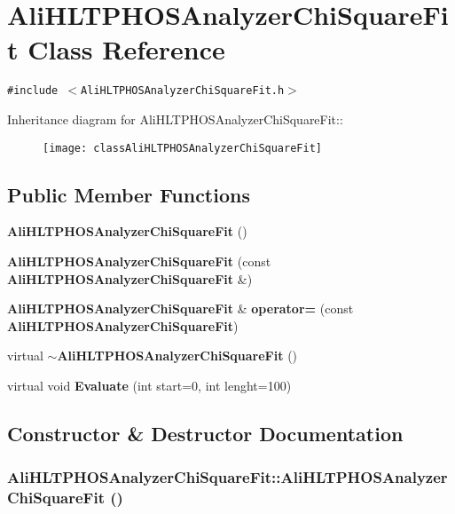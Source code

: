 \section{Ali\-HLTPHOSAnalyzer\-Chi\-Square\-Fit Class Reference}
\label{classAliHLTPHOSAnalyzerChiSquareFit}
{\tt \#include $<$Ali\-HLTPHOSAnalyzer\-Chi\-Square\-Fit.h$>$}

Inheritance diagram for Ali\-HLTPHOSAnalyzer\-Chi\-Square\-Fit::\begin{figure}[H]
\begin{center}
\leavevmode
\texttt{[image: classAliHLTPHOSAnalyzerChiSquareFit]}
\end{center}
\end{figure}
\subsection*{Public Member Functions}
\begin{CompactItemize}
\item 
{\bf Ali\-HLTPHOSAnalyzer\-Chi\-Square\-Fit} ()
\item 
{\bf Ali\-HLTPHOSAnalyzer\-Chi\-Square\-Fit} (const {\bf Ali\-HLTPHOSAnalyzer\-Chi\-Square\-Fit} \&)
\item 
{\bf Ali\-HLTPHOSAnalyzer\-Chi\-Square\-Fit} \& {\bf operator=} (const {\bf Ali\-HLTPHOSAnalyzer\-Chi\-Square\-Fit})
\item 
virtual {\bf $\sim$Ali\-HLTPHOSAnalyzer\-Chi\-Square\-Fit} ()
\item 
virtual void {\bf Evaluate} (int start=0, int lenght=100)
\end{CompactItemize}


\subsection{Constructor \& Destructor Documentation}
\subsubsection{\setlength{\rightskip}{0pt plus 5cm}Ali\-HLTPHOSAnalyzer\-Chi\-Square\-Fit::Ali\-HLTPHOSAnalyzer\-Chi\-Square\-Fit ()}\label{classAliHLTPHOSAnalyzerChiSquareFit_a0}


